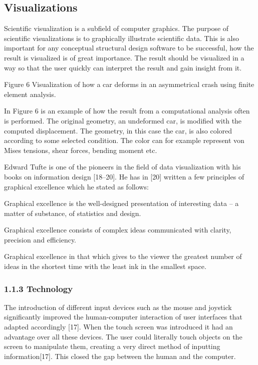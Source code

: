\subsection{Visualizations}
Scientific visualization is a subfield of computer graphics. The purpose of scientific visualizations is to graphically illustrate scientific data. This is also important for any conceptual structural design software to be successful, how the result is visualized is of great importance. The result should be visualized in a way so that the user quickly can interpret the result and gain insight from it. 


Figure 6 Visualization of how a car deforms in an asymmetrical crash using finite element analysis.

In Figure 6 is an example of how the result from a computational analysis often is performed. The original geometry, an undeformed car, is modified with the computed displacement. The geometry, in this case the car, is also colored according to some selected condition. The color can for example represent von Mises tensions, shear forces, bending moment etc. 



Edward Tufte is one of the pioneers in the field of data visualization with his books on information design [18–20]. He has in [20] written a few principles of graphical excellence which he stated as follows:



\item Graphical excellence is the well-designed presentation of interesting data – a matter of substance, of statistics and design.

\item Graphical excellence consists of complex ideas communicated with clarity, precision and efficiency.

\item Graphical excellence in that which gives to the viewer the greatest number of ideas in the shortest time with the least ink in the smallest space.

\subsubsection[1.1.3 Technology]{1.1.3 Technology}
The introduction of different input devices such as the mouse and joystick significantly improved the human-computer interaction of user interfaces that adapted accordingly [17]. When the touch screen was introduced it had an advantage over all these devices. The user could literally touch objects on the screen to manipulate them, creating a very direct method of inputting information[17]. This closed the gap between the human and the computer.



